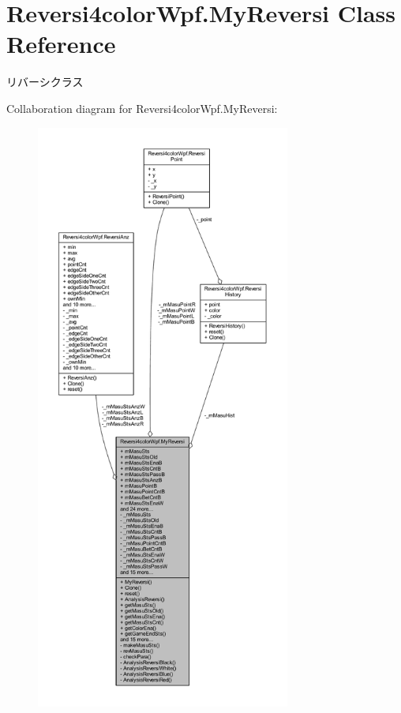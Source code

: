 \hypertarget{class_reversi4color_wpf_1_1_my_reversi}{}\section{Reversi4color\+Wpf.\+My\+Reversi Class Reference}
\label{class_reversi4color_wpf_1_1_my_reversi}


リバーシクラス  




Collaboration diagram for Reversi4color\+Wpf.\+My\+Reversi\+:
\nopagebreak
\begin{figure}[H]
\begin{center}
\leavevmode
\includegraphics[height=550pt]{class_reversi4color_wpf_1_1_my_reversi__coll__graph}
\end{center}
\end{figure}
